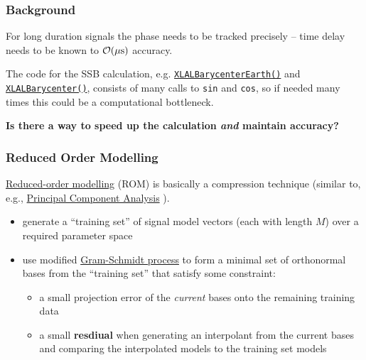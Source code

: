 \begin{frame}

\frametitle{Background}
\label{background}

For long duration signals the phase needs to be tracked precisely -- time delay needs to be known
to $\mathcal{O}(\mu{\rm s})$ accuracy.


The code for the SSB calculation, e.g. \href{http://software.ligo.org/docs/lalsuite/lalpulsar/\_l\_a\_l\_barycenter\_8c\_source.html\#l00078}{\texttt{XLALBarycenterEarth()}}  and  \href{http://software.ligo.org/docs/lalsuite/lalpulsar/\_l\_a\_l\_barycenter\_8c\_source.html\#l00828}{\texttt{XLALBarycenter()}}, 
consists of many calls to \texttt{sin} and \texttt{cos}, so if needed many times this could be a computational bottleneck.

\textbf{Is there a way to speed up the calculation \emph{and} maintain accuracy?}

\end{frame}

\begin{frame}

\frametitle{Reduced Order Modelling}
\label{reducedordermodelling}

 \href{https://en.wikipedia.org/wiki/Model_order_reduction}{Reduced-order modelling}  (ROM) is basically a compression technique (similar to, e.g.,  \href{https://en.wikipedia.org/wiki/Principal_component_analysis}{Principal
Component Analysis} ).

\begin{itemize}
\item generate a ``training set'' of signal model vectors (each with length $M$) over a required parameter space

\item use modified  \href{https://en.wikipedia.org/wiki/Gram\%E2\%80\%93Schmidt\_process}{Gram-Schmidt process}  to form a
 minimal set of orthonormal bases from the ``training set'' that satisfy some constraint:

\begin{itemize}
\item a small projection error of the \emph{current} bases onto the remaining training data

\item a small \textbf{resdiual} when generating an interpolant from the current bases and
 comparing the interpolated models to the training set models

\end{itemize}

\end{itemize}

\end{frame}

